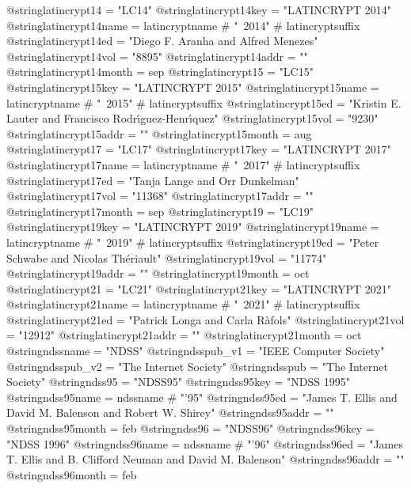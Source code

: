 @string{latincrypt14 =          "LC14"}
@string{latincrypt14key =       "LATINCRYPT 2014"}
@string{latincrypt14name =      latincryptname # "~2014" # latincryptsuffix}
@string{latincrypt14ed =        "Diego F. Aranha and Alfred Menezes"}
@string{latincrypt14vol =       "8895"}
@string{latincrypt14addr =      ""}
@string{latincrypt14month =     sep}
@string{latincrypt15 =          "LC15"}
@string{latincrypt15key =       "LATINCRYPT 2015"}
@string{latincrypt15name =      latincryptname # "~2015" # latincryptsuffix}
@string{latincrypt15ed =        "Kristin E. Lauter and Francisco {Rodr{\'\i}guez-Henr{\'\i}quez}"}
@string{latincrypt15vol =       "9230"}
@string{latincrypt15addr =      ""}
@string{latincrypt15month =     aug}
@string{latincrypt17 =          "LC17"}
@string{latincrypt17key =       "LATINCRYPT 2017"}
@string{latincrypt17name =      latincryptname # "~2017" # latincryptsuffix}
@string{latincrypt17ed =        "Tanja Lange and Orr Dunkelman"}
@string{latincrypt17vol =       "11368"}
@string{latincrypt17addr =      ""}
@string{latincrypt17month =     sep}
@string{latincrypt19 =          "LC19"}
@string{latincrypt19key =       "LATINCRYPT 2019"}
@string{latincrypt19name =      latincryptname # "~2019" # latincryptsuffix}
@string{latincrypt19ed =        "Peter Schwabe and Nicolas Th{\'e}riault"}
@string{latincrypt19vol =       "11774"}
@string{latincrypt19addr =      ""}
@string{latincrypt19month =     oct}
@string{latincrypt21 =          "LC21"}
@string{latincrypt21key =       "LATINCRYPT 2021"}
@string{latincrypt21name =      latincryptname # "~2021" # latincryptsuffix}
@string{latincrypt21ed =        "Patrick Longa and Carla R{\`a}fols"}
@string{latincrypt21vol =       "12912"}
@string{latincrypt21addr =      ""}
@string{latincrypt21month =     oct}
@string{ndssname =              "NDSS"}
@string{ndsspub_v1 =            "IEEE Computer Society"}
@string{ndsspub_v2 =            "The Internet Society"}
@string{ndsspub =               "The Internet Society"}
@string{ndss95 =                "NDSS95"}
@string{ndss95key =             "NDSS 1995"}
@string{ndss95name =            ndssname # "'95"}
@string{ndss95ed =              "James T. Ellis and David M. Balenson and Robert W. Shirey"}
@string{ndss95addr =            ""}
@string{ndss95month =           feb}
@string{ndss96 =                "NDSS96"}
@string{ndss96key =             "NDSS 1996"}
@string{ndss96name =            ndssname # "'96"}
@string{ndss96ed =              "James T. Ellis and B. Clifford Neuman and David M. Balenson"}
@string{ndss96addr =            ""}
@string{ndss96month =           feb}
